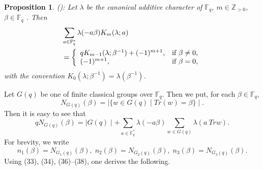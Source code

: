 \documentclass[a4,12pt]{elsart}
\newtheorem{proposition}[theorem]{Proposition}
\begin{document}
\begin{proposition}\label{I}(\cite{D3}):
Let  $\lambda$ be the canonical additive character of ${\mathbb{F}}_q$, $m
\in \mathbb{Z}_{> 0}$, $\beta \in {\mathbb{F}}_q$ . Then
\begin{align}\label{a37}
\begin{split}
& \sum_{a \in {\mathbb{F}}_q^*} \lambda(-a \beta) K_m(\lambda;a) \\
&= \left\{\begin{array}{ll}
    qK_{m-1}(\lambda;\beta^{-1})+(-1)^{m+1}, & \hbox{if $\beta \neq 0$,} \\
    (-1)^{m+1}, & \hbox{if $\beta = 0$,} \\
\end{array}\right.
\end{split}
\end{align}
with the convention $K_0(\lambda;\beta^{-1})=\lambda(\beta^{-1})$.
\end{proposition}

Let  $G(q)$ be  one of finite classical groups over ${\mathbb{F}}_q$. Then we
put, for each $\beta \in {\mathbb{F}}_q$,
 \[
N_{G(q)}(\beta) = \mid \{ w \in G(q) \mid Tr(w) = \beta \} \mid .
 \]
Then it is easy to see that
\begin{equation}\label{38}
qN_{G(q)}(\beta) = \mid G(q) \mid + \sum_{a \in {\mathbb{F}}_q^*} \lambda(-a
\beta)\sum_{w \in G(q)} \lambda(a ~Trw).
\end{equation}
For brevity, we write
\begin{equation}\label{39}
n_1(\beta) = N_{G_1(q)}(\beta), \; n_2(\beta) = N_{G_2(q)}(\beta),
 \; n_3(\beta) = N_{G_3(q)}(\beta).
\end{equation}
Using  (33), (34), (36)--(38), one derives the following.
\end{document}
